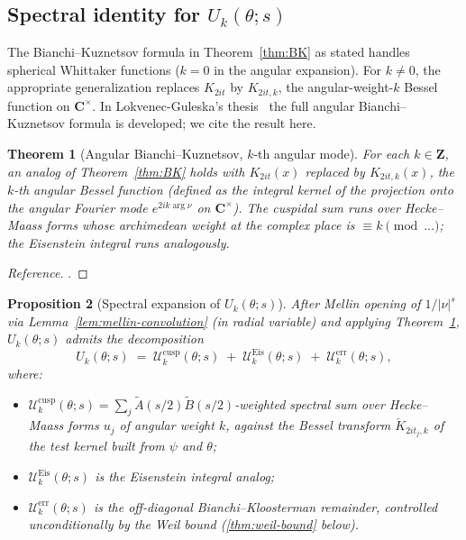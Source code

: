\documentclass[11pt]{article}
\newtheorem{theorem}{Theorem}[section]
\newtheorem{proposition}[theorem]{Proposition}
\theoremstyle{definition}
\newcommand{\Z}{\mathbf{Z}}
\newcommand{\C}{\mathbf{C}}
\begin{document}
\subsection{Spectral identity for $U_k(\theta;s)$}\label{ssec:spectral-Uk}

The Bianchi--Kuznetsov formula in Theorem~\ref{thm:BK} as stated handles spherical Whittaker functions ($k=0$ in the angular expansion). For $k\ne 0$, the appropriate generalization replaces $K_{2it}$ by $K_{2it,k}$, the angular-weight-$k$ Bessel function on $\C^\times$. In Lokvenec-Guleska's thesis~\cite[Ch.~5]{LG} the full angular Bianchi--Kuznetsov formula is developed; we cite the result here.

\begin{theorem}[Angular Bianchi--Kuznetsov, $k$-th angular mode]\label{thm:BK-angular}
For each $k\in\Z$, an analog of Theorem~\ref{thm:BK} holds with $K_{2it}(x)$ replaced by $K_{2it,k}(x)$, the $k$-th angular Bessel function (defined as the integral kernel of the projection onto the angular Fourier mode $e^{2ik\arg\nu}$ on $\C^\times$). The cuspidal sum runs over Hecke--Maass forms whose archimedean weight at the complex place is $\equiv k\pmod{\dots}$; the Eisenstein integral runs analogously.
\end{theorem}

\begin{proof}[Reference]
\cite[Ch.~5, Thm.~5.4 with angular Fourier expansion]{LG}.
\end{proof}

\begin{proposition}[Spectral expansion of $U_k(\theta;s)$]\label{prop:Uk-spectral}
After Mellin opening of $1/|\nu|^s$ via Lemma~\ref{lem:mellin-convolution} (in radial variable) and applying Theorem~\ref{thm:BK-angular}, $U_k(\theta;s)$ admits the decomposition
\[
   U_k(\theta;s)\;=\;\mathcal U_k^{\text{cusp}}(\theta;s)\;+\;\mathcal U_k^{\text{Eis}}(\theta;s)\;+\;\mathcal U_k^{\text{err}}(\theta;s),
\]
where:
\begin{itemize}
\item $\mathcal U_k^{\text{cusp}}(\theta;s)=\sum_j\widetilde A(s/2)\widetilde B(s/2)$-weighted spectral sum over Hecke--Maass forms $u_j$ of angular weight $k$, against the Bessel transform $\check{K}_{2it_j,k}$ of the test kernel built from $\psi$ and $\theta$;
\item $\mathcal U_k^{\text{Eis}}(\theta;s)$ is the Eisenstein integral analog;
\item $\mathcal U_k^{\text{err}}(\theta;s)$ is the off-diagonal Bianchi--Kloosterman remainder, controlled unconditionally by the Weil bound (\ref{thm:weil-bound} below).
\end{itemize}
\end{proposition}
\end{document}
